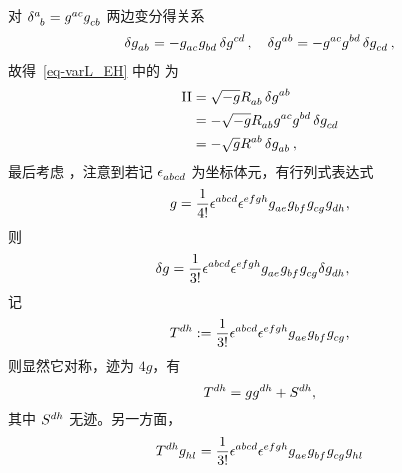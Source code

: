 \begin{Proof}
			对 $\tensor{\delta}{^a_b} = \tensor{g}{^a^c} \tensor{g}{_c_b}$ 两边变分得关系
			\begin{equation}
				\begin{split}
					\var{\tensor{g}{_a_b}} = - \tensor{g}{_a_c} \tensor{g}{_b_d} \var{\tensor{g}{^c^d}} \qc \var{\tensor{g}{^a^b}} = - \tensor{g}{^a^c} \tensor{g}{^b^d} \var{\tensor{g}{_c_d}},
				\end{split}
			\end{equation}
			故得~\eqref{eq-varL_EH} 中的  为
			\begin{equation}
				\begin{split}
					\RomanNumeralCaps{2} &= \sqrt{-g} \tensor{R}{_a_b} \var{\tensor{g}{^a^b}}\\
					&= - \sqrt{-g} \tensor{R}{_a_b} \tensor{g}{^a^c} \tensor{g}{^b^d} \var{\tensor{g}{_c_d}}\\
					&= - \sqrt{g} \tensor{R}{^a^b} \var{\tensor{g}{_a_b}},
				\end{split}
			\end{equation}
			最后考虑 ，注意到若记 $\tensor{\nvol}{_a_b_c_d}$ 为坐标体元，有行列式表达式
			\begin{equation}
				g = \frac{1}{4!} \tensor{\nvol}{^a^b^c^d} \tensor{\nvol}{^e^f^g^h} \tensor{g}{_a_e} \tensor{g}{_b_f} \tensor{g}{_c_g} \tensor{g}{_d_h},
			\end{equation}
			则
			\begin{equation}
				\begin{split}
					\var g &= \frac{1}{3!} \tensor{\nvol}{^a^b^c^d} \tensor{\nvol}{^e^f^g^h} \tensor{g}{_a_e} \tensor{g}{_b_f} \tensor{g}{_c_g} \var \tensor{g}{_d_h},
				\end{split}
			\end{equation}
			记
			\begin{equation}
				\tensor{T}{^d^h} \definedby \frac{1}{3!} \tensor{\nvol}{^a^b^c^d} \tensor{\nvol}{^e^f^g^h} \tensor{g}{_a_e} \tensor{g}{_b_f} \tensor{g}{_c_g},
			\end{equation}
			则显然它对称，迹为 $4g$，有
			\begin{equation}
				\tensor{T}{^d^h} = g \tensor{g}{^d^h} + \tensor{S}{^d^h},
			\end{equation}
			其中 $\tensor{S}{^d^h}$ 无迹。另一方面，
			\begin{equation}
				\begin{split}
					\tensor{T}{^d^h} \tensor{g}{_h_l} &= \frac{1}{3!} \tensor{\nvol}{^a^b^c^d} \tensor{\nvol}{^e^f^g^h} \tensor{g}{_a_e} \tensor{g}{_b_f} \tensor{g}{_c_g} \tensor{g}{_h_l}\\

\end{split}
\end{equation}
\end{Proof}
